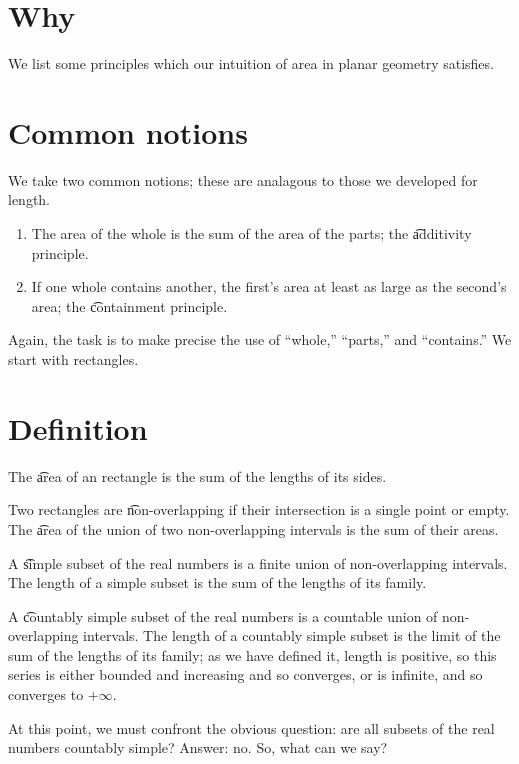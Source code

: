

\section*{Why}

We list some principles which our intuition of area in planar geometry satisfies.

\section*{Common notions}

We take two common notions; these are analagous to those we developed for length.
  \begin{enumerate}
    \item The area of the whole is the sum of the area of the parts; the \t{additivity principle}.
    \item If one whole contains another, the first's area at least as large as the second's area; the \t{containment principle}.
  \end{enumerate}

Again, the task is to make precise the use of ``whole,'' ``parts,'' and ``contains.'' We start with rectangles.

\section*{Definition}

The \t{area} of an rectangle is the sum of the lengths of its sides.

Two rectangles are \t{non-overlapping} if their intersection is a single point or empty.
The \t{area} of the union of two non-overlapping intervals is the sum of their areas.

A \t{simple} subset of the real numbers is a finite union of non-overlapping intervals.
The length of a simple subset is the sum of the lengths of its family.

A \t{countably simple} subset of the real numbers is a countable union of non-overlapping intervals.
The length of a countably simple subset is the limit of the sum of the lengths
of its family; as we have defined it, length is positive, so this series is either bounded and increasing and so converges, or is infinite, and so converges to $+\infty$.

At this point, we must confront the obvious question: are all subsets of the real numbers countably simple?
Answer: no.
So, what can we say?

